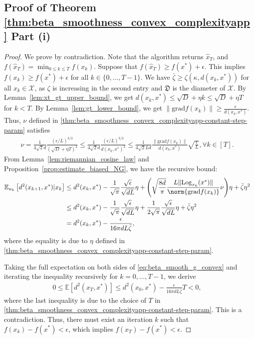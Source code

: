 \documentclass{article}
\newcommand{\rgrad}{\mathrm{grad}}
\newcommand{\Log}{\mathrm{Log}}
\newcommand{\pert}{\nu}
\theoremstyle{plain}
\theoremstyle{definition}
\theoremstyle{remark}
\begin{document}
\subsection{Proof of Theorem \ref{thm:beta_smoothness_convex_complexityapp} Part (i)}\label{pf:beta_smoothness_convex_complexity}
\begin{proof}
We prove by contradiction. Note that the algorithm returns $\hat{x}_T$, and $f(\hat{x}_T) = \min_{0\le k\le T} f(x_k)$. Suppose that $f(\hat{x}_T) \geq f(x^*) + \epsilon$. This implies $f(x_k) \geq f(x^*) + \epsilon$ for all $k \in \{0, \dots, T-1\}$. 
We have $\bar\zeta\geq\zeta(\kappa,d(x_k,x^*))$ for all $x_k\in\mathcal{X}$, as $\zeta$ is increasing in the second entry and $\mathfrak{D}$ is the diameter of $\mathcal{X}$. 
By Lemma~\ref{lem:xt_gt_upper_bound}, we get $d(x_{k},x^*)\leq \sqrt{D}+\eta k \leq \sqrt{D}+\eta T$ for $k < T$. By Lemma~\ref{lem:gt_lower_bound}, we get $\|\rgrad f(x_k)\|\geq \frac{\epsilon}{d(x_k,x^*)}$. Thus, $\nu$ defined in \eqref{thm:beta_smoothness_convex_complexityapp-constant-step-param} satisfies
\begin{align}\label{nu-upper-bound}
\pert = \frac{1}{4\sqrt{2}d} \frac{(\epsilon/L)^{3/2}}{(\sqrt{D} + \eta T)^2} \leq \frac{1}{4\sqrt{2}d} \frac{(\epsilon/L)^{3/2}}{d(x_k, x^*)^2} \leq \frac{1}{4\sqrt{2}Ld} \frac{\|\rgrad f(x_k)\|}{d(x_k, x^*)} \sqrt{\frac{\epsilon}{L}}, \forall k\in[T].
\end{align}
From Lemma~\ref{lem:riemannian_cosine_law} and Proposition~\ref{prop:estimate_biased_NG}, we have the recursive bound:
\begin{align}
\mathbb{E}_{u_k}\left[d^2(x_{k+1}, x^*)|x_k\right] 
&\leq d^2(x_k ,x^*) -\frac{1}{\sqrt{\pi}}\frac{\sqrt{\epsilon}}{\sqrt{d{L}}}\eta + {\left(\sqrt{\frac{8d}{\pi}}\frac{{L}\|\Log_{x_k}(x^*)\|}{\norm{\rgrad f(x_k)}}\pert\right)}\eta + \bar\zeta\eta^2\nonumber\\
&\leq d^2(x_k ,x^*) -\frac{1}{\sqrt{\pi}}\frac{\sqrt{\epsilon}}{\sqrt{d{L}}}\eta +\frac{1}{2\sqrt{\pi}}\frac{\sqrt{\epsilon}}{\sqrt{d{L}}}\eta + \bar\zeta\eta^2\nonumber\\
&=  d^2(x_k ,x^*) - \frac{\epsilon}{16\pi d{L}\bar{\zeta}},\label{eq:beta_smooth_g_convex}
\end{align}
where the equality is due to $\eta$ defined in \eqref{thm:beta_smoothness_convex_complexityapp-constant-step-param}. 

Taking the full expectation on both sides of \eqref{eq:beta_smooth_g_convex} and iterating the inequality recursively for $k=0, \ldots, T-1$, we derive 
\begin{equation*}\label{eq:dist_ub}
\begin{aligned}
0\leq \mathbb{E}\left[ d^2(x_{T}, x^*) \right]
\leq d^2(x_0 ,x^*) - \frac{\epsilon}{16\pi d{L}\bar{\zeta}}T < 0,
\end{aligned}
\end{equation*}
where the last inequality is due to the choice of $T$ in \eqref{thm:beta_smoothness_convex_complexityapp-constant-step-param}. This is a contradiction. 
Thus, there must exist an iteration $k$ such that $f(x_k) - f(x^*) < \epsilon$, which implies $f(\hat{x}_T) - f(x^*) < \epsilon$.
\end{proof}
\end{document}
